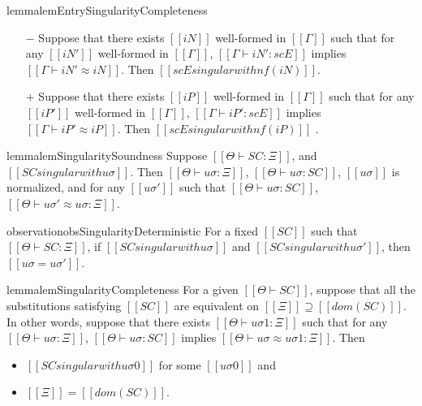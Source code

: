 \begin{restatable}{lemma}{lemEntrySingularityCompleteness}
    \label{lemma:entry-singularity-completeness}
    \hfill
    \begin{itemize}
        \item [$-$] Suppose that there exists $[[iN]]$ well-formed in $[[Γ]]$ 
            such that for any $[[iN']]$ well-formed in $[[Γ]]$,
            $[[Γ ⊢ iN' : scE]]$ implies $[[Γ ⊢ iN' ≈ iN]]$. 
            Then $[[scE singular with nf(iN)]]$.
        \item [$+$] Suppose that there exists $[[iP]]$ well-formed in $[[Γ]]$ 
            such that for any $[[iP']]$ well-formed in $[[Γ]]$,
            $[[Γ ⊢ iP' : scE]]$ implies $[[Γ ⊢ iP' ≈ iP]]$. 
            Then $[[scE singular with nf(iP)]]$ .
    \end{itemize}
\end{restatable}

\begin{restatable}{lemma}{lemSingularitySoundness}
    \label{lemma:singularity-soundness}
    Suppose $[[Θ ⊢ SC : Ξ]]$, and $[[SC singular with uσ]]$. 
    Then $[[ Θ ⊢ uσ : Ξ ]]$, 
     $[[ Θ ⊢ uσ : SC ]]$, $[[uσ]]$ is normalized, and for any 
    $[[uσ']]$ such that $[[Θ ⊢ uσ : SC]]$,
    $[[Θ ⊢ uσ' ≈ uσ : Ξ]]$.
\end{restatable}

\begin{restatable}{observation}{obsSingularityDeterministic}
    For a fixed $[[SC]]$ such that $[[Θ ⊢ SC : Ξ]]$,
    if $[[SC singular with uσ]]$ and $[[SC singular with uσ']]$,
    then $[[uσ = uσ']]$.
\end{restatable}

\begin{restatable}{lemma}{lemSingularityCompleteness}
    \label{lemma:singularity-completeness}
    For a given $[[Θ ⊢ SC]]$,
    suppose that all the substitutions satisfying $[[SC]]$ are equivalent
    on $[[Ξ]] \supseteq [[dom(SC)]]$.
    In other words, suppose that there exists $[[Θ ⊢ uσ1 : Ξ]]$ such that
    for any $[[Θ ⊢ uσ : Ξ]]$, $[[Θ ⊢ uσ : SC]]$ implies 
    $[[Θ ⊢ uσ ≈ uσ1 : Ξ]]$.
    Then 
    \begin{itemize}
        \item $[[SC singular with uσ0]]$ for some $[[uσ0]]$ and
        \item $[[Ξ]] = [[dom(SC)]]$.
    \end{itemize} 
\end{restatable}

